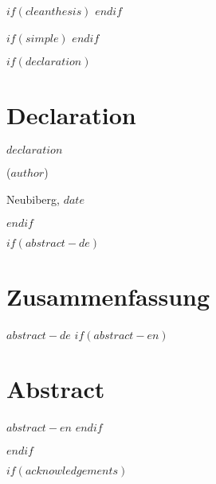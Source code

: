 
$if(cleanthesis)$
\clearpage
\customtitlebackpage
$endif$

$if(simple)$
\clearpage
\customtitlebackpage
$endif$

$if(declaration)$
\chapter*{Declaration}

\thispagestyle{empty}

\vspace{2cm}

$declaration$

\vspace{2cm}

\makeatletter

\noindent ($author$)

Neubiberg, $date$

\makeatother

$endif$





$if(abstract-de)$

\chapter*{Zusammenfassung}
\thispagestyle{empty}
\vspace{2cm}
$abstract-de$
$if(abstract-en)$
\chapter*{Abstract}
$abstract-en$
$endif$

\cleardoublepage
$endif$



$if(acknowledgements)$
